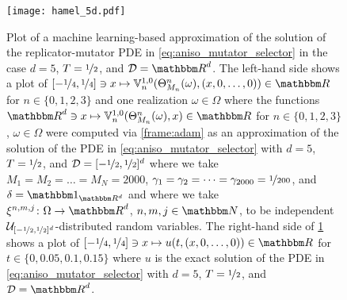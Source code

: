 \begin{table}
\begin{center}
{\begin{approxtabular}
			\hline
		\end{approxtabular}}
	\end{center}
	\caption{Numerical simulations for the approximation method in \cref{def:general_algorithm} in the case of the replicator-mutator PDEs in \eqref{eq:aniso_mutator_selector} in \cref{subsec:aniso_mutator_selector}
	where we assume for every
		$n,m,j\in\N$
	that
		$\mathcal D=\R^d$,
		$\xi^{n,m,j}=0$,
		$\gamma_m = \nicefrac{1}{100}$,
		and
		$M_n=1000$
	and where we assume for every
	  $\mathbf x\in\R^d$
	that
	  $\delta(\mathbf x)=(2\pi)^{-\nicefrac d2}\mathfrak t^{-d}\exp\bpr{-\tfrac{\norm{\mathbf x}^2}{2\mathfrak t^2}}$.
	\label{table:aniso_mutator_selector}
	}
\end{table}

\begin{figure}
	\centering
	\texttt{[image: hamel\_5d.pdf]}
	\caption{Plot of a machine learning-based approximation of the solution of the replicator-mutator PDE in \cref{eq:aniso_mutator_selector} in the case $d=5$, $T=\nicefrac12$, and $\mathcal D=\R^d$.
	The left-hand side shows a plot of $[-\nicefrac{1}{4}, \nicefrac{1}{4}] \ni x \mapsto \bV_n^{1,0}(\Theta^n_{M_n}(\omega),(x, 0, \dots,0)) \in \R$ for $n\in\{0,1,2,3\}$ and one realization $\omega\in\Omega$ where the functions $\R^d\ni x\mapsto \bV_n^{1,0}(\Theta^n_{M_n}(\omega),x)\in\R$ for $n\in\{0,1,2,3\}$, $\omega\in\Omega$ were computed via \cref{frame:adam} as an approximation of the solution of the PDE in \cref{eq:aniso_mutator_selector} with $d=5$, $T=\nicefrac12$, and $\mathcal D=[-\nicefrac 12,\nicefrac 12]^d$ where we take
		$M_1=M_2=\ldots=M_N=2000$,
		$\gamma_1=\gamma_2=\dots=\gamma_{2000}=\nicefrac{1}{200}$,
		and
		$\delta=\one_{\R^d}$
		and where we take
		$\xi^{n,m,j}\colon\Omega\to\R^d$, $n, m, j \in \N$,
		to be independent $\mathcal{U}_{[-\nicefrac{1}{2},\nicefrac{1}{2}]^d}$-distributed random variables.
	The right-hand side of \cref{fig:rep_mut} shows a plot of $[-\nicefrac{1}{4}, \nicefrac{1}{4}] \ni x \mapsto u(t, (x, 0,  \dots,0)) \in \R$ for $t\in\{0,0.05,0.1,0.15\}$ where $u$ is the exact solution of the PDE in \cref{eq:aniso_mutator_selector} with $d=5$, $T=\nicefrac12$, and $\mathcal D=\R^d$.
	\label{fig:rep_mut}}
\end{figure}


